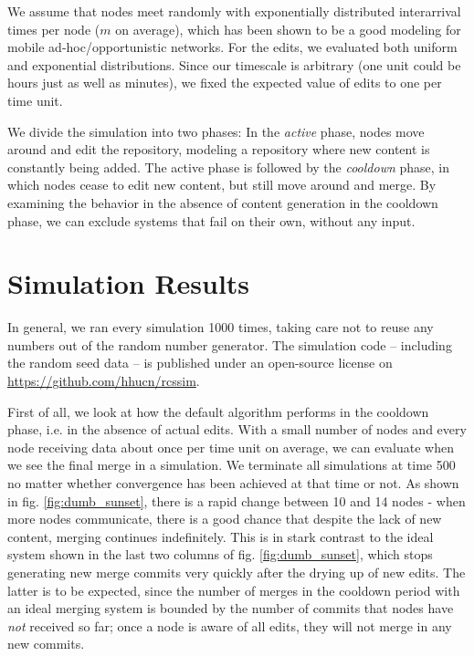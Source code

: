\documentclass[conference,a4paper]{IEEEtran}
\begin{document}
We assume that nodes meet randomly with exponentially distributed interarrival times per node ($m$ on average), which has been shown to be a good modeling for mobile ad-hoc/opportunistic networks\cite{groenevelt}. For the edits, we evaluated both uniform and exponential distributions. Since our timescale is arbitrary (one unit could be hours just as well as minutes), we fixed the expected value of edits to one per time unit.

We divide the simulation into two phases: In the \textit{active} phase, nodes move around and edit the repository, modeling a repository where new content is constantly being added. The active phase is followed by the \textit{cooldown} phase, in which nodes cease to edit new content, but still move around and merge. By examining the behavior in the absence of content generation in the cooldown phase, we can exclude systems that fail on their own, without any input.

\section{Simulation Results}

In general, we ran every simulation 1000 times, taking care not to reuse any numbers out of the random number generator. The simulation code -- including the random seed data -- is published under an open-source license on \url{https://github.com/hhucn/rcssim}.

First of all, we look at how the default algorithm performs in the cooldown phase, i.e. in the absence of actual edits. With a small number of nodes and every node receiving data about once per time unit on average, we can evaluate when we see the final merge in a simulation. We terminate all simulations at time 500 no matter whether convergence has been achieved at that time or not. As shown in fig. \ref{fig:dumb_sunset}, there is a rapid change between 10 and 14 nodes - when more nodes communicate, there is a good chance that despite the lack of new content, merging continues indefinitely. This is in stark contrast to the ideal system shown in the last two columns of fig. \ref{fig:dumb_sunset}, which stops generating new merge commits very quickly after the drying up of new edits. The latter is to be expected, since the number of merges in the cooldown period with an ideal merging system is bounded by the number of commits that nodes have \textit{not} received so far; once a node is aware of all edits, they will not merge in any new commits.
\end{document}
